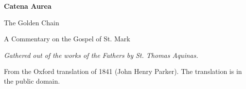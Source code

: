 \documentclass[11pt,letterpaper]{article}
\begin{document}
\color{ink}

\begin{titlepage}
\centering
\vspace*{4em}
{\LARGE\bfseries\color{heading} Catena Aurea\par}
\vspace{1em}
{\large The Golden Chain\par}
\vspace{2em}
{\Large\color{subhead} A Commentary on the Gospel of St. Mark\par}
\vspace{2.5em}
{\itshape\color{subhead} Gathered out of the works of the Fathers by
St. Thomas Aquinas.\par}
\vfill
{\small From the Oxford translation of 1841 (John Henry Parker). The
translation is in the public domain.\par}
\vspace{2em}
\end{titlepage}

\tableofcontents


\end{document}
